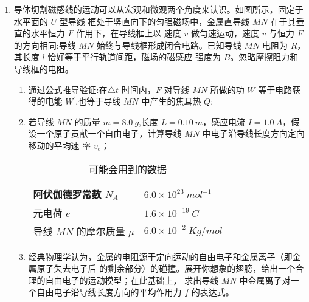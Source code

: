 \begin{enumerate}
\item 
{}
导体切割磁感线的运动可以从宏观和微观两个角度来认识。如图所示，固定于水平面的 $ U $ 型导线
框处于竖直向下的匀强磁场中，金属直导线 $ MN $ 在于其垂直的水平恒力 $ F $ 作用下，在导线框上以
速度 $ v $ 做匀速运动，速度 $ v $ 与恒力 $ F $ 的方向相同:导线 $ MN $ 始终与导线框形成闭合电路。已知导线
$ MN $ 电阻为 $ R $，其长度 $ l $ 恰好等于平行轨道间距，磁场的磁感应
强度为 $ B $。忽略摩擦阻力和导线框的电阻。
\begin{enumerate}
\item
通过公式推导验证:在$ \triangle t $ 时间内，$ F $ 对导线 $ MN $ 所做的功
$ W $ 等于电路获得的电能 $ W ^{\prime} $,也等于导线 $ MN $ 中产生的焦耳热 $ Q $;
\item 
若导线 $ MN $ 的质量 $ m=8.0 \ g $,长度 $ L=0.10 \ m $，感应电流
$ I=1.0 \ A $，假设一个原子贡献一个自由电子，计算导线 $ MN $ 中电子沿导线长度方向定向移动的平均速
率 $ v_{e} $；
\begin{table}[h!]
\centering
\begin{tabular}{|l|l|}
\hline 阿伏伽德罗常数 $N_{A}$ & $6.0 \times 10^{23} \ mol^{-1}$ \\
\hline 元电荷 $e$ & $1.6 \times 10^{-19} \ C$ \\
\hline 导线 $M N$ 的摩尔质量 $\mu$ & $6.0 \times 10^{-2} \ Kg / mol$ \\
\hline
\end{tabular}
\caption{可能会用到的数据}
\end{table}
\item 
经典物理学认为，金属的电阻源于定向运动的自由电子和金属离子（即金属原子失去电子后
的剩余部分）的碰撞。展开你想象的翅膀，给出一个合理的自由电子的运动模型；在此基础上，
求出导线 $ MN $ 中金属离子对一个自由电子沿导线长度方向的平均作用力 $ f $ 的表达式。


\end{enumerate}
\begin{figure}[h!]
\flushright

\end{figure}




\end{enumerate}
